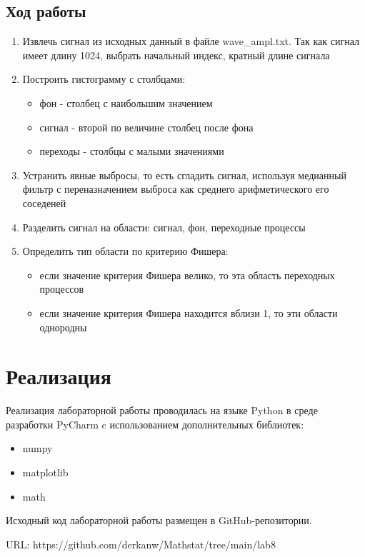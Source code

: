 \documentclass[12pt,a4paper]{article}
\begin{document}
\subsection{Ход работы}
\begin{enumerate}
    \item Извлечь сигнал из исходных данный в файле wave\_ampl.txt. Так как сигнал имеет длину 1024, выбрать начальный индекс, кратный длине сигнала
    \item Построить гистограмму с столбцами:
        \begin{itemize}
            \item фон - столбец с наибольшим значением
            \item сигнал - второй по величине столбец после фона
            \item переходы - столбцы с малыми значениями
        \end{itemize}
    \item Устранить явные выбросы, то есть сгладить сигнал, используя медианный фильтр с переназначением выброса как среднего арифметического его соседеней
    \item Разделить сигнал на области: сигнал, фон, переходные процессы
    \item Определить тип области по критерию Фишера:
        \begin{itemize}
            \item если значение критерия Фишера велико, то эта область переходных процессов
            \item если значение критерия Фишера находится вблизи 1, то эти области однородны
        \end{itemize}
\end{enumerate}

\section{Реализация}
Реализация лабораторной работы проводилась на языке Python в среде разработки PyCharm c использованием дополнительных библиотек:
\begin{itemize}
    \item numpy
    \item matplotlib
    \item math
\end{itemize}

Исходный код лабораторной работы размещен в GitHub-репозитории.

URL: https://github.com/derkanw/Mathstat/tree/main/lab8
\end{document}
